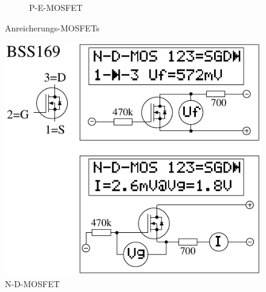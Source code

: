 \begin{figure}[H]
\begin{subfigure}[b]{9cm}
    \caption{P-E-MOSFET}
    \label{fig:MOS-P-E}
  \end{subfigure}
  \caption{Anreicherungs-MOSFETs}
\end{figure}



\begin{figure}[H]
\centering
\includegraphics[]{../FIG/MOS_BSS169.pdf}
\caption{N-D-MOSFET}
\label{fig:MOS-N-D}
\end{figure}

